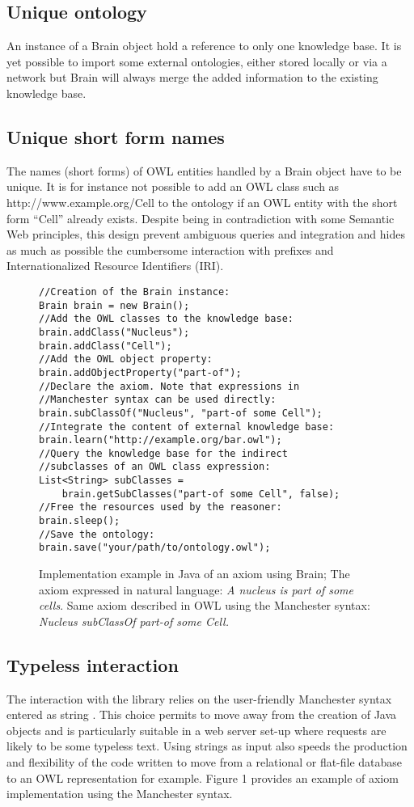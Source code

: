 \documentclass{bioinfo}
\begin{document}
\subsection{Unique ontology}
An instance of a Brain object hold a reference to only one knowledge base. It is yet possible to import some external ontologies, either
stored locally or via a network but Brain will always merge the added information to the existing knowledge base.
\subsection{Unique short form names}
The names (short forms) of OWL entities handled by a Brain object have to be unique. It is for instance not possible to add
an OWL class such as http://www.example.org/Cell to the ontology if an OWL entity with the short form ``Cell'' already exists.
Despite being in contradiction with some Semantic Web principles, this design prevent ambiguous queries and integration
and hides as much as possible the cumbersome interaction with prefixes and Internationalized Resource Identifiers (IRI).

\begin{figure}[h]
\begingroup
\fontsize{7pt}{8pt}\selectfont
\begin{Verbatim}[frame=single]
//Creation of the Brain instance:
Brain brain = new Brain();
//Add the OWL classes to the knowledge base:
brain.addClass("Nucleus");
brain.addClass("Cell");
//Add the OWL object property:
brain.addObjectProperty("part-of");
//Declare the axiom. Note that expressions in 
//Manchester syntax can be used directly:
brain.subClassOf("Nucleus", "part-of some Cell");
//Integrate the content of external knowledge base:
brain.learn("http://example.org/bar.owl");
//Query the knowledge base for the indirect
//subclasses of an OWL class expression:
List<String> subClasses = 
    brain.getSubClasses("part-of some Cell", false);
//Free the resources used by the reasoner:
brain.sleep();
//Save the ontology:
brain.save("your/path/to/ontology.owl");
\end{Verbatim}
\endgroup
\caption{Implementation example in Java of an axiom using Brain; The axiom expressed in natural language:
 \textit{A nucleus is part of some cells}. Same axiom described in OWL using the Manchester syntax: 
 \textit{Nucleus subClassOf part-of some Cell.}}
\end{figure}

\subsection{Typeless interaction}
The interaction with the library relies on the user-friendly Manchester syntax entered as string \citep{Horridge2006}. 
This choice permits to move away from the creation of Java objects and is particularly suitable in a web server set-up where
requests are likely to be some typeless text. Using strings as input also speeds the production
and flexibility of the code written to move from a relational or flat-file database to an OWL representation for example. Figure 1 provides
an example of axiom implementation using the Manchester syntax.
\end{document}
